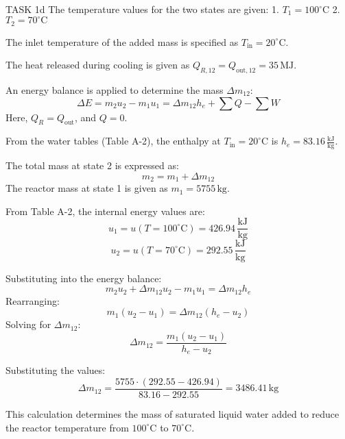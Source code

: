 TASK 1d  
The temperature values for the two states are given:  
1. \( T_1 = 100^\circ\text{C} \)  
2. \( T_2 = 70^\circ\text{C} \)  

The inlet temperature of the added mass is specified as \( T_{\text{in}} = 20^\circ\text{C} \).  

The heat released during cooling is given as \( Q_{R,12} = Q_{\text{out},12} = 35 \, \text{MJ} \).  

An energy balance is applied to determine the mass \( \Delta m_{12} \):  
\[
\Delta E = m_2 u_2 - m_1 u_1 = \Delta m_{12} h_e + \sum Q - \sum W
\]  
Here, \( Q_R = Q_{\text{out}} \), and \( Q = 0 \).  

From the water tables (Table A-2), the enthalpy at \( T_{\text{in}} = 20^\circ\text{C} \) is \( h_e = 83.16 \, \frac{\text{kJ}}{\text{kg}} \).  

The total mass at state 2 is expressed as:  
\[
m_2 = m_1 + \Delta m_{12}
\]  
The reactor mass at state 1 is given as \( m_1 = 5755 \, \text{kg} \).  

From Table A-2, the internal energy values are:  
\[
u_1 = u(T = 100^\circ\text{C}) = 426.94 \, \frac{\text{kJ}}{\text{kg}}
\]  
\[
u_2 = u(T = 70^\circ\text{C}) = 292.55 \, \frac{\text{kJ}}{\text{kg}}
\]  

Substituting into the energy balance:  
\[
m_2 u_2 + \Delta m_{12} u_2 - m_1 u_1 = \Delta m_{12} h_e
\]  
Rearranging:  
\[
m_1 (u_2 - u_1) = \Delta m_{12} (h_e - u_2)
\]  
Solving for \( \Delta m_{12} \):  
\[
\Delta m_{12} = \frac{m_1 (u_2 - u_1)}{h_e - u_2}
\]  

Substituting the values:  
\[
\Delta m_{12} = \frac{5755 \cdot (292.55 - 426.94)}{83.16 - 292.55} = 3486.41 \, \text{kg}
\]  

This calculation determines the mass of saturated liquid water added to reduce the reactor temperature from \( 100^\circ\text{C} \) to \( 70^\circ\text{C} \).